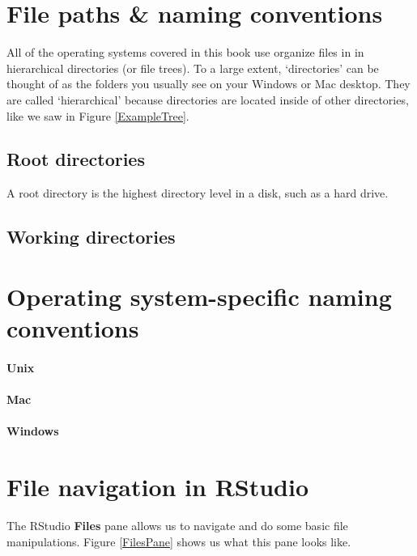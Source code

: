 \section{File paths \& naming conventions}

All of the operating systems covered in this book use organize files in in hierarchical directories (or file trees). To a large extent, `directories' can be thought of as the folders you usually see on your Windows or Mac desktop. They are called `hierarchical' because directories are located inside of other directories, like we saw in Figure \ref{ExampleTree}. 

\subsection{Root directories}

A root directory is the highest directory level in a disk, such as a hard drive.

\subsection{Working directories}

\section{Operating system-specific naming conventions}

\paragraph{Unix}

\paragraph{Mac}

\paragraph{Windows}

\section{File navigation in RStudio}

The RStudio {\bf{Files}} pane allows us to navigate and do some basic file manipulations. Figure \ref{FilesPane} shows us what this pane looks like.

